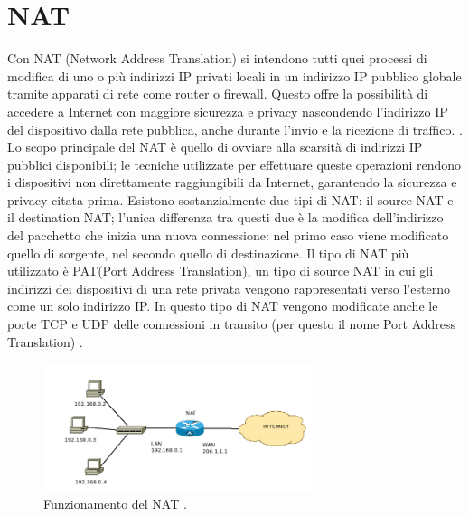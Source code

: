 \documentclass[11pt, a4paper, openany]{book}
\begin{document}
 	\chapter{NAT}
 	Con NAT (Network Address Translation) si intendono tutti quei processi di modifica di uno o più indirizzi IP privati locali in un indirizzo IP pubblico globale tramite apparati di rete come router o firewall. Questo offre la possibilità di accedere a Internet con maggiore sicurezza e privacy nascondendo l'indirizzo IP del dispositivo dalla rete pubblica, anche durante l'invio e la ricezione di traffico. \cite{51}. Lo scopo principale del NAT è quello di ovviare alla scarsità di indirizzi IP pubblici disponibili; le tecniche utilizzate per effettuare queste operazioni rendono i dispositivi non direttamente raggiungibili da Internet, garantendo la sicurezza e privacy citata prima. Esistono sostanzialmente due tipi di NAT: il source NAT e il destination NAT; l'unica differenza tra questi due è la modifica dell'indirizzo del pacchetto che inizia una nuova connessione: nel primo caso viene modificato quello di sorgente, nel secondo quello di destinazione. Il tipo di NAT più utilizzato è PAT(Port Address Translation), un tipo di source NAT in cui gli indirizzi dei dispositivi di una rete privata vengono rappresentati verso l'esterno come un solo indirizzo IP. In questo tipo di NAT vengono modificate anche le porte TCP e UDP delle connessioni in transito (per questo il nome Port Address Translation) \cite{52}.
 	\begin{figure}[h!]
 		\centering
 		\includegraphics[width=0.7\textwidth]{img/nat.png}
 		\caption{Funzionamento del NAT \cite{75}.}
 	\end{figure}
 
\end{document}
